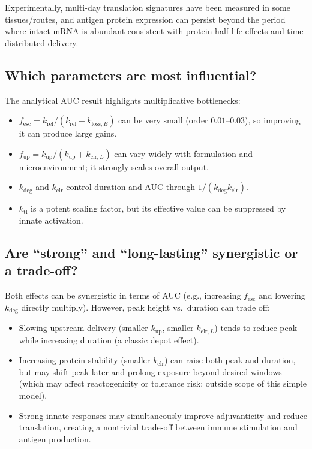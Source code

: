 Experimentally, multi-day translation signatures have been measured in some tissues/routes, and antigen protein expression can persist beyond the period where intact mRNA is abundant \textemdash{} consistent with protein half-life effects and time-distributed delivery. \parencite{pardi2015expressionKinetics}

\subsection*{Which parameters are most influential?}

The analytical AUC result highlights multiplicative bottlenecks:
\begin{itemize}
    \item $f_{\mathrm{esc}} = k_{\mathrm{rel}}/(k_{\mathrm{rel}} + k_{\mathrm{loss},E})$ can be very small (order $0.01$--$0.03$), so improving it can produce large gains.
    \item $f_{\mathrm{up}} = k_{\mathrm{up}}/(k_{\mathrm{up}} + k_{\mathrm{clr},L})$ can vary widely with formulation and microenvironment; it strongly scales overall output.
    \item $k_{\mathrm{deg}}$ and $k_{\mathrm{clr}}$ control duration and AUC through $1/(k_{\mathrm{deg}}k_{\mathrm{clr}})$.
    \item $k_{\mathrm{tl}}$ is a potent scaling factor, but its effective value can be suppressed by innate activation.
\end{itemize}

\subsection*{Are ``strong'' and ``long-lasting'' synergistic or a trade-off?}

Both effects can be synergistic in terms of AUC (e.g., increasing $f_{\mathrm{esc}}$ and lowering $k_{\mathrm{deg}}$ directly multiply). However, peak height vs.~duration can trade off:
\begin{itemize}
    \item Slowing upstream delivery (smaller $k_{\mathrm{up}}$, smaller $k_{\mathrm{clr},L}$) tends to reduce peak while increasing duration (a classic depot effect).
    \item Increasing protein stability (smaller $k_{\mathrm{clr}}$) can raise both peak and duration, but may shift peak later and prolong exposure beyond desired windows (which may affect reactogenicity or tolerance risk; outside scope of this simple model).
    \item Strong innate responses may simultaneously improve adjuvanticity and reduce translation, creating a nontrivial trade-off between immune stimulation and antigen production.
\end{itemize}

